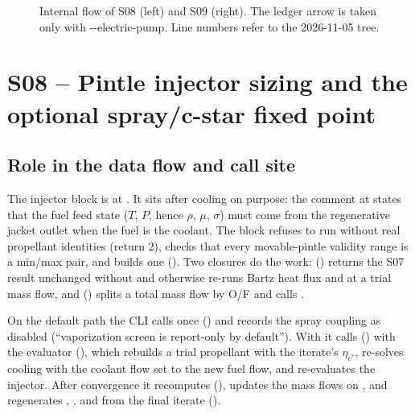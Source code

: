 \begin{figure}[!t]
\caption{Internal flow of S08 (left) and S09 (right). The ledger arrow is taken only with -{}-electric-pump. Line numbers refer to the 2026-11-05 tree.}
\label{fig:s08-s09-flow}
\end{figure}

\section{S08 -- Pintle injector sizing and the optional spray/c-star fixed point}\label{sec:s08}

\subsection{Role in the data flow and call site}

The injector block is  at
. It sits after cooling on purpose: the comment at
 states that the fuel feed state ($T$, $P$, hence $\rho$, $\mu$,
$\sigma$) must come from the regenerative jacket outlet when the fuel is the
coolant. The block refuses to run without real propellant identities (return 2),
checks that every movable-pintle validity range is a min/max pair, and builds one
 (). Two closures do the work:
 () returns the S07 result unchanged without
 and otherwise re-runs Bartz heat flux and
 at a trial mass flow, and
 () splits a total mass flow by O/F and
calls .

On the default path the CLI calls 
once () and records the spray coupling as disabled (``vaporization
screen is report-only by default''). With  it calls
 () with the
evaluator  (), which rebuilds a trial propellant
with the iterate's $\eta_{c^*}$, re-solves cooling with the coolant flow set to the
new fuel flow, and re-evaluates the injector. After convergence it recomputes
 (), updates the mass flows on
, and regenerates , ,
 and  from the final iterate
().

